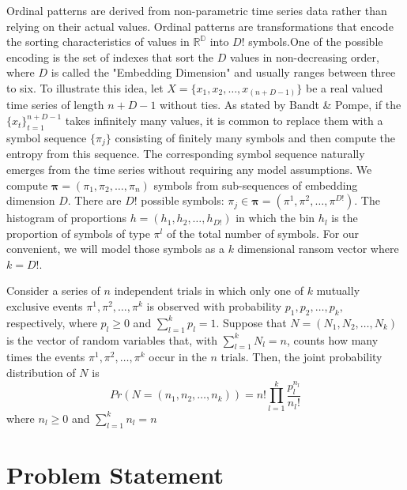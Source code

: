 Ordinal patterns are derived from non-parametric time series data rather than relying on their actual values. Ordinal patterns are transformations that encode the sorting characteristics of values in $\mathbb{R^D}$ into $D!$ symbols.One of the possible encoding is the set of indexes that sort the $D$ values in non-decreasing order, where $D$ is called the "Embedding Dimension" and usually ranges between three to six.  To illustrate this idea, let $X=\{x_1,x_2, \dots, x_{(n+D-1)}\}$ be a real valued time series of length $n+D-1$ without ties. As stated by Bandt \& Pompe, if the $\{x_t\}_{t=1}^{n+D-1}$ takes infinitely many values, it is common to replace them with a symbol sequence $\{{\pi}_j\}$ consisting of finitely many symbols and then compute the entropy from this sequence. The corresponding symbol sequence naturally emerges from the time series without requiring any model assumptions. We compute $\mathbf{{\pi}}=({\pi}_1, {\pi}_2,\dots, {\pi}_n)$ symbols from sub-sequences of embedding dimension $D$. There are $D!$ possible symbols: $\pi_j \in \mathbf{{\pi}}=({\pi}^1, {\pi}^2,\dots, {\pi}^{D!})$. The histogram of proportions $h=(h_1,h_2,\dots, h_{D!})$ in which the bin $h_l$ is the proportion of symbols of type $\pi^l$ of the total number of symbols. For our convenient, we will model those symbols as a $k$ dimensional ransom vector where $k=D!$.

Consider a series of $n$ independent trials in which only one of $k$ mutually exclusive events ${\pi}^1, {\pi}^2,\dots, {\pi}^k$ is observed with probability $p_1, p_2, \dots, p_k,$ respectively, where $p_l \geq 0$ and $\sum_{l=1}^{k} p_l=1.$ Suppose that $N=(N_1, N_2, \dots, N_k)$ is the vector of random variables that, with $\sum_{l=1}^{k} N_l=n$, counts how many times the events ${\pi}^1, {\pi}^2,\dots, {\pi}^k$ occur in the $n$ trials. Then, the joint probability distribution of $N$ is
\begin{equation}
	Pr(N=(n_1,n_2,\dots, n_k))=n!\prod_{l=1}^{k} \frac{p_l^{n_l}}{n_l !}
\end{equation}    
where $n_l \geq 0$ and $\sum_{l=1}^{k} n_l=n$ 


\section*{Problem Statement}

